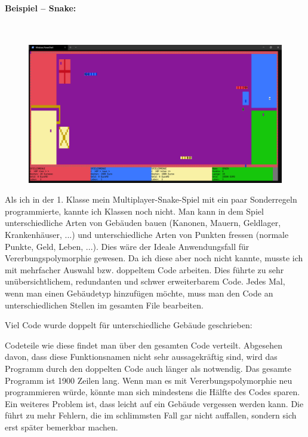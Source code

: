 			\paragraph*{Beispiel -- Snake:}\mbox{}\\
				\begin{figure}[H]
					\includegraphics[width=\textwidth]{polymorphie/universell/vererbung/beispiele/snake/snake.png}
				\end{figure}
				
				Als ich in der 1. Klasse mein Multiplayer-Snake-Spiel mit ein paar Sonderregeln programmierte, kannte ich
				Klassen noch nicht. Man kann in dem Spiel unterschiedliche Arten von Gebäuden bauen (Kanonen, Mauern,
				Geldlager, Krankenhäuser, ...) und unterschiedliche Arten von Punkten fressen (normale Punkte, Geld, Leben,
				...). Dies wäre der Ideale Anwendungsfall für Vererbungspolymorphie gewesen. Da ich diese aber noch nicht
				kannte, musste ich mit mehrfacher Auswahl bzw. doppeltem Code arbeiten. Dies führte zu sehr unübersichtlichem,
				redundanten und schwer erweiterbarem Code. Jedes Mal, wenn man einen Gebäudetyp hinzufügen möchte, muss man den
				Code an unterschiedlichen Stellen im gesamten File bearbeiten.
				
				Viel Code wurde doppelt für unterschiedliche Gebäude geschrieben:
				
				\UseRawInputEncoding{}
				
				Codeteile wie diese findet man über den gesamten Code verteilt. Abgesehen davon, dass diese
				Funktionsnamen nicht sehr aussagekräftig sind, wird das Programm durch den doppelten Code
				auch länger als notwendig. Das gesamte Programm ist 1900 Zeilen lang. Wenn man es mit
				Vererbungspolymorphie neu programmieren würde, könnte man sich mindestens die Hälfte des Codes sparen.
				Ein weiteres Problem ist, dass leicht auf ein Gebäude vergessen werden kann. Die führt zu mehr Fehlern,
				die im schlimmsten Fall gar nicht auffallen, sondern sich erst später bemerkbar machen.
				

